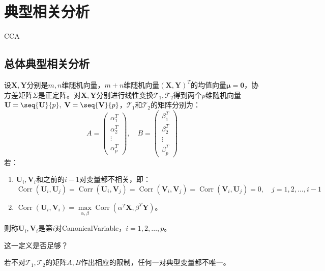 \section{典型相关分析}
\gls{CCA}
\subsection{总体典型相关分析}
\begin{definition}
	设$\mathbf{X},\mathbf{Y}$分别是$m,n$维随机向量，$m+n$维随机向量$(\mathbf{X},\mathbf{Y})^T$的均值向量$\boldsymbol{\mu}=\mathbf{0}$，协方差矩阵$\Sigma$是正定阵。对$\mathbf{X},\mathbf{Y}$分别进行线性变换$\mathcal{T}_1,\mathcal{T}_2$得到两个$p$维随机向量$\mathbf{U}=\seq{\mathbf{U}}{p},\;\mathbf{V}=\seq{\mathbf{V}}{p}$，$\mathcal{T}_1$和$\mathcal{T}_2$的矩阵分别为：
	\begin{equation*}
		A=
		\begin{pmatrix}
			\alpha_1^T \\
			\alpha_2^T \\
			\vdots \\
			\alpha_p^T
		\end{pmatrix},\quad
		B=
		\begin{pmatrix}
			\beta_1^T \\
			\beta_2^T \\
			\vdots \\
			\beta_p^T
		\end{pmatrix}
	\end{equation*}
	若：
	\begin{enumerate}
		\item $\mathbf{U}_i,\mathbf{V}_i$和之前的$i-1$对变量都不相关，即：
		\begin{equation*}
			\operatorname{Corr}(\mathbf{U}_i,\mathbf{U}_j)=\operatorname{Corr}(\mathbf{U}_i,\mathbf{V}_j)=\operatorname{Corr}(\mathbf{V}_i,\mathbf{V}_j)=\operatorname{Corr}(\mathbf{V}_i,\mathbf{U}_j)=0,\quad j=1,2,\dots,i-1
		\end{equation*}
		\item $\operatorname{Corr}(\mathbf{U}_i,\mathbf{V}_i)=\max\limits_{\alpha,\beta}\operatorname{Corr}(\alpha^T\mathbf{X},\beta^T\mathbf{Y})$。
	\end{enumerate}
	则称$\mathbf{U}_i,\mathbf{V}_i$是第$i$对\gls{CanonicalVariable}，$i=1,2,\dots,p$。
\end{definition}
这一定义是否足够？
\begin{theorem}
	若不对$\mathcal{T}_1,\mathcal{T}_2$的矩阵$A,B$作出相应的限制，任何一对典型变量都不唯一。
\end{theorem}
